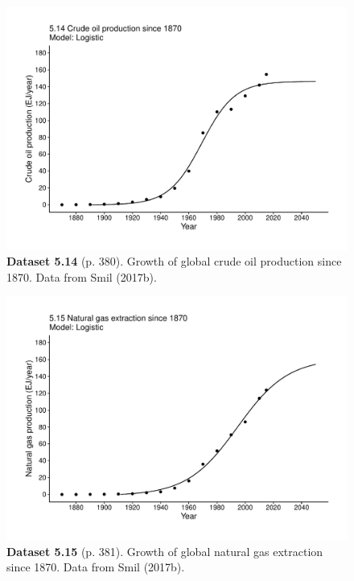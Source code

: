 \documentclass[aps,rmp,preprint,superscriptaddress,10pt,onecolumn]{article}
\begin{document}
\clearpage
\begin{figure}[h]
\includegraphics[width=\textwidth]{output/figs-ggplot/5.14.pdf}
\caption*{\textbf{Dataset 5.14} (p. 380). Growth of global crude oil production since 1870. Data from Smil (2017b).}
\end{figure}
	
\clearpage
\begin{figure}[h]
\includegraphics[width=\textwidth]{output/figs-ggplot/5.15.pdf}
\caption*{\textbf{Dataset 5.15} (p. 381). Growth of global natural gas extraction since 1870. Data from Smil (2017b).}
\end{figure}
	
\end{document}
